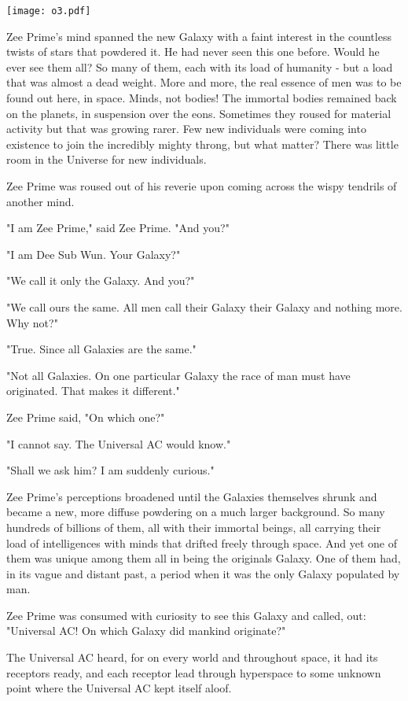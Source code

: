 \documentclass[11pt,twocolumn,paper=a5,pagesize]{article}
\newcommand{\futurethree}[1]{ #1 }
\newcommand{\sepc}[0]{\vspace{.6cm} {\centering 

\texttt{[image: o3.pdf]}

}\vspace{.6cm}}
\begin{document}
\sepc{}

\futurethree{
Zee Prime's mind spanned the new Galaxy with a faint interest in the countless twists of stars that powdered it. He had never seen this one before. Would he ever see them all? So many of them, each with its load of humanity - but a load that was almost a dead weight. More and more, the real essence of men was to be found out here, in space.
Minds, not bodies! The immortal bodies remained back on the planets, in suspension over the eons. Sometimes they roused for material activity but that was growing rarer. Few new individuals were coming into existence to join the incredibly mighty throng, but what matter? There was little room in the Universe for new individuals.

Zee Prime was roused out of his reverie upon coming across the wispy tendrils of another mind.

"I am Zee Prime," said Zee Prime. "And you?"

"I am Dee Sub Wun. Your Galaxy?"

"We call it only the Galaxy. And you?"

"We call ours the same. All men call their Galaxy their Galaxy and nothing more. Why not?"

"True. Since all Galaxies are the same."

"Not all Galaxies. On one particular Galaxy the race of man must have originated. That makes it different."

Zee Prime said, "On which one?"

"I cannot say. The Universal AC would know."

"Shall we ask him? I am suddenly curious."

Zee Prime's perceptions broadened until the Galaxies themselves shrunk and became a new, more diffuse powdering on a much larger background. So many hundreds of billions of them, all with their immortal beings, all carrying their load of intelligences with minds that drifted freely through space. And yet one of them was unique among them all in being the originals Galaxy. One of them had, in its vague and distant past, a period when it was the only Galaxy populated by man.

Zee Prime was consumed with curiosity to see this Galaxy and called, out: "Universal AC! On which Galaxy did mankind originate?"

The Universal AC heard, for on every world and throughout space, it had its receptors ready, and each receptor lead through hyperspace to some unknown point where the Universal AC kept itself aloof.

}
\end{document}
